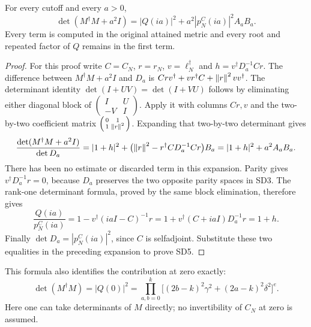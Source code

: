 \documentclass[11pt]{article}
\begin{document}
\begin{osdtheorem}
For every cutoff and every $a>0$,
\begin{equation}\tag{SD5}
\boxed{\det(M^\dagger M+a^2I)
=|Q(ia)|^2+a^2|p_N^C(ia)|^2 A_aB_a.}
\end{equation}
Every term is computed in the original attained metric and every root
and repeated factor of $Q$ remains in the first term.
\end{osdtheorem}
\begin{proof}
For this proof write $C=C_N$, $r=r_N$, $v=\ell_N^\dagger$ and
$h=v^\dagger D_a^{-1}Cr$. The difference between $M^\dagger M+a^2I$
and $D_a$ is
$Crv^\dagger+vr^\dagger C+\left\lVert r\right\rVert^2vv^\dagger$.
The determinant identity $\det(I+UV)=\det(I+VU)$ follows by eliminating
either diagonal block of $\left(\begin{smallmatrix}I&U\\-V&I\end{smallmatrix}\right)$.
Apply it with columns $Cr,v$ and the two-by-two coefficient matrix
$\left(\begin{smallmatrix}0&1\\1&\left\lVert r\right\rVert^2\end{smallmatrix}\right)$.
Expanding that two-by-two determinant gives
\[
\frac{\det(M^\dagger M+a^2I)}{\det D_a}
=|1+h|^2+
\bigl(\left\lVert r\right\rVert^2-r^\dagger CD_a^{-1}Cr\bigr)B_a
=|1+h|^2+a^2A_aB_a.
\]
There has been no estimate or discarded term in this expansion.
Parity gives $v^\dagger D_a^{-1}r=0$, because $D_a$ preserves the two
opposite parity spaces in SD3. The rank-one determinant formula,
proved by the same block elimination, therefore gives
\[
\frac{Q(ia)}{p_N^C(ia)}
=1-v^\dagger(iaI-C)^{-1}r
=1+v^\dagger(C+iaI)D_a^{-1}r=1+h.
\]
Finally $\det D_a=|p_N^C(ia)|^2$, since $C$ is selfadjoint. Substitute
these two equalities in the preceding expansion to prove SD5.
\end{proof}

This formula also identifies the contribution at zero exactly:
\begin{equation}\tag{SD6}
\det(M^\dagger M)=|Q(0)|^2
=\prod_{a,b=0}^k\bigl[(2b-k)^2\gamma^2+(2a-k)^2\delta^2\bigr]^e.
\end{equation}
Here one can take determinants of $M$ directly; no invertibility of
$C_N$ at zero is assumed.
\end{document}
